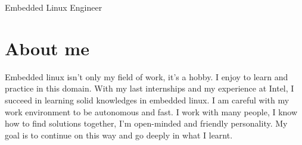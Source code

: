 \documentclass[letterpaper]{jm-cv} %
\begin{document}






\makeprofile %


\begin{center}
  {\Huge\color{black!80}Embedded Linux Engineer}
\end{center}

\section{About me}
\newline
Embedded linux isn't only my field of work, it's a hobby.
\newline
I enjoy to learn and practice in this domain.
\newline
With my last internships and my experience at Intel, I succeed in learning solid knowledges in embedded linux.
\newline
I am careful with my work environment to be autonomous and fast.
\newline
I work with many people, I know how to find solutions together, I'm open-minded and friendly personality.
\newline
My goal is to continue on this way and go deeply in what I learnt.
\end{document}
